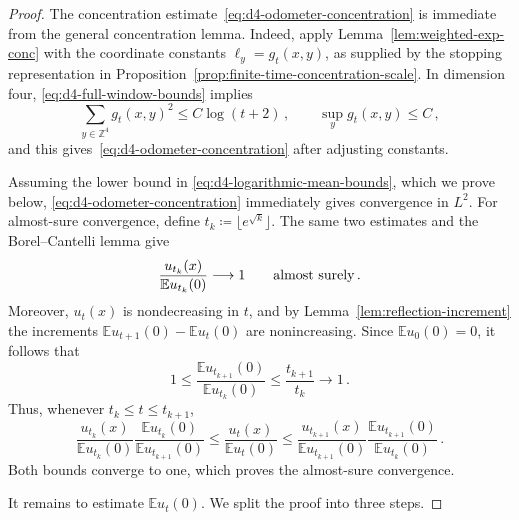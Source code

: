 \documentclass[11pt]{amsart}
\theoremstyle{plain}
\theoremstyle{definition}
\newcommand{\Z}{\mathbb{Z}}
\newcommand{\E}{\mathbb{E}}
\begin{document}
		\begin{proof}
			The concentration estimate~\eqref{eq:d4-odometer-concentration} is immediate from the general concentration
			lemma. Indeed, apply
			Lemma~\ref{lem:weighted-exp-conc} with the coordinate constants
			$\ell_y=g_t(x,y)$, as supplied by the stopping representation in
			Proposition~\ref{prop:finite-time-concentration-scale}. In
			dimension four, \eqref{eq:d4-full-window-bounds} implies
			\[
				\sum_{y\in\Z^4} g_t(x,y)^2\leq C\log(t+2)\, ,
				\qquad
				\sup_y g_t(x,y)\leq C\, ,
			\]
			and this gives~\eqref{eq:d4-odometer-concentration} after adjusting constants. 

			Assuming the lower bound in \eqref{eq:d4-logarithmic-mean-bounds}, which
			we prove below, \eqref{eq:d4-odometer-concentration} immediately gives
			convergence in $L^2$. For almost-sure convergence, define
			$t_k\coloneqq\lfloor e^{\sqrt{k}}\rfloor$. The same two estimates and the
			Borel--Cantelli lemma give
			\[
				\frac{u_{t_k}(x)}{\E u_{t_k}(0)}\longrightarrow1
				\qquad\textup{almost surely}\, .
			\]
			Moreover, $u_t(x)$ is
			nondecreasing in $t$, and by Lemma~\ref{lem:reflection-increment} the
			increments $\E u_{t+1}(0)-\E u_t(0)$ are nonincreasing. Since $\E u_0(0)=0$, it follows
			that
			\[
				1\leq
				\frac{\E u_{t_{k+1}}(0)}{\E u_{t_k}(0)}
				\leq\frac{t_{k+1}}{t_k}
				\longrightarrow1 \, .
			\]
			Thus, whenever $t_k\leq t\leq t_{k+1}$,
			\[
				\frac{u_{t_k}(x)}{\E u_{t_k}(0)}
				\frac{\E u_{t_k}(0)}{\E u_{t_{k+1}}(0)}
				\leq
				\frac{u_t(x)}{\E u_t(0)}
				\leq
				\frac{u_{t_{k+1}}(x)}{\E u_{t_{k+1}}(0)}
				\frac{\E u_{t_{k+1}}(0)}{\E u_{t_k}(0)} \, .
			\]
			Both bounds converge to one, which proves the almost-sure convergence.

			\medskip

			It remains to estimate $\E u_t(0)$. We split the proof into three steps.


\end{proof}
\end{document}

